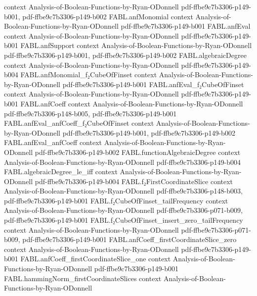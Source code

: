 \begin{theorem}
  {context}
  {Analysis-of-Boolean-Functions-by-Ryan-ODonnell}
  {pdf-ffbe9c7b3306-p149-b001,
    pdf-ffbe9c7b3306-p149-b002}
\proofstep
  {FABL.anfMonomial}
  {context}
  {Analysis-of-Boolean-Functions-by-Ryan-ODonnell}
  {pdf-ffbe9c7b3306-p149-b001}
\proofstep
  {FABL.anfEval}
  {context}
  {Analysis-of-Boolean-Functions-by-Ryan-ODonnell}
  {pdf-ffbe9c7b3306-p149-b001}
\proofstep
  {FABL.anfSupport}
  {context}
  {Analysis-of-Boolean-Functions-by-Ryan-ODonnell}
  {pdf-ffbe9c7b3306-p149-b001,
    pdf-ffbe9c7b3306-p149-b002}
\proofstep
  {FABL.algebraicDegree}
  {context}
  {Analysis-of-Boolean-Functions-by-Ryan-ODonnell}
  {pdf-ffbe9c7b3306-p149-b004}
\proofstep
  {FABL.anfMonomial_f₂CubeOfFinset}
  {context}
  {Analysis-of-Boolean-Functions-by-Ryan-ODonnell}
  {pdf-ffbe9c7b3306-p149-b001}
\proofstep
  {FABL.anfEval_f₂CubeOfFinset}
  {context}
  {Analysis-of-Boolean-Functions-by-Ryan-ODonnell}
  {pdf-ffbe9c7b3306-p149-b001}
\proofstep
  {FABL.anfCoeff}
  {context}
  {Analysis-of-Boolean-Functions-by-Ryan-ODonnell}
  {pdf-ffbe9c7b3306-p148-b005,
    pdf-ffbe9c7b3306-p149-b001}
\proofstep
  {FABL.anfEval_anfCoeff_f₂CubeOfFinset}
  {context}
  {Analysis-of-Boolean-Functions-by-Ryan-ODonnell}
  {pdf-ffbe9c7b3306-p149-b001,
    pdf-ffbe9c7b3306-p149-b002}
\proofstep
  {FABL.anfEval_anfCoeff}
  {context}
  {Analysis-of-Boolean-Functions-by-Ryan-ODonnell}
  {pdf-ffbe9c7b3306-p149-b002}
\proofstep
  {FABL.functionAlgebraicDegree}
  {context}
  {Analysis-of-Boolean-Functions-by-Ryan-ODonnell}
  {pdf-ffbe9c7b3306-p149-b004}
\proofstep
  {FABL.algebraicDegree_le_iff}
  {context}
  {Analysis-of-Boolean-Functions-by-Ryan-ODonnell}
  {pdf-ffbe9c7b3306-p149-b004}
\proofstep
  {FABL.f₂FirstCoordinateSlice}
  {context}
  {Analysis-of-Boolean-Functions-by-Ryan-ODonnell}
  {pdf-ffbe9c7b3306-p148-b003,
    pdf-ffbe9c7b3306-p149-b001}
\proofstep
  {FABL.f₂CubeOfFinset_tailFrequency}
  {context}
  {Analysis-of-Boolean-Functions-by-Ryan-ODonnell}
  {pdf-ffbe9c7b3306-p071-b009,
    pdf-ffbe9c7b3306-p149-b001}
\proofstep
  {FABL.f₂CubeOfFinset_insert_zero_tailFrequency}
  {context}
  {Analysis-of-Boolean-Functions-by-Ryan-ODonnell}
  {pdf-ffbe9c7b3306-p071-b009,
    pdf-ffbe9c7b3306-p149-b001}
\proofstep
  {FABL.anfCoeff_firstCoordinateSlice_zero}
  {context}
  {Analysis-of-Boolean-Functions-by-Ryan-ODonnell}
  {pdf-ffbe9c7b3306-p149-b001}
\proofstep
  {FABL.anfCoeff_firstCoordinateSlice_one}
  {context}
  {Analysis-of-Boolean-Functions-by-Ryan-ODonnell}
  {pdf-ffbe9c7b3306-p149-b001}
\proofstep
  {FABL.hammingNorm_firstCoordinateSlices}
  {context}
  {Analysis-of-Boolean-Functions-by-Ryan-ODonnell}

\end{theorem}
